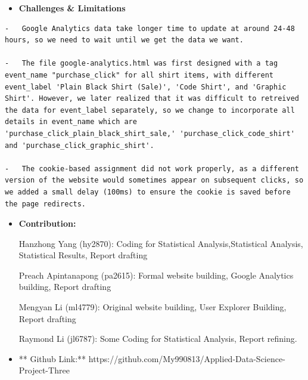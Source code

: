 \documentclass[
  letterpaper,
  DIV=11,
  numbers=noendperiod]{scrartcl}
\providecommand{\tightlist}{%
  \setlength{\itemsep}{0pt}\setlength{\parskip}{0pt}}\usepackage{longtable,booktabs,array}
\begin{document}
\begin{itemize}
\tightlist
\item
  \textbf{Challenges \& Limitations}
\end{itemize}

\begin{verbatim}
-   Google Analytics data take longer time to update at around 24-48 hours, so we need to wait until we get the data we want.

-   The file google-analytics.html was first designed with a tag event_name "purchase_click" for all shirt items, with different event_label 'Plain Black Shirt (Sale)', 'Code Shirt', and 'Graphic Shirt'. However, we later realized that it was difficult to retreived the data for event_label separately, so we change to incorporate all details in event_name which are 'purchase_click_plain_black_shirt_sale,' 'purchase_click_code_shirt' and 'purchase_click_graphic_shirt'.

-   The cookie-based assignment did not work properly, as a different version of the website would sometimes appear on subsequent clicks, so we added a small delay (100ms) to ensure the cookie is saved before the page redirects.
\end{verbatim}

\begin{itemize}
\item
  \textbf{Contribution:}

  Hanzhong Yang (hy2870): Coding for Statistical Analysis,Statistical
  Analysis, Statistical Results, Report drafting

  Preach Apintanapong (pa2615): Formal website building, Google
  Analytics building, Report drafting

  Mengyan Li (ml4779): Original website building, User Explorer
  Building, Report drafting

  Raymond Li (jl6787): Some Coding for Statistical Analysis, Report
  refining.
\item
  ** Github Link:**
  https://github.com/My990813/Applied-Data-Science-Project-Three
\end{itemize}
\end{document}

